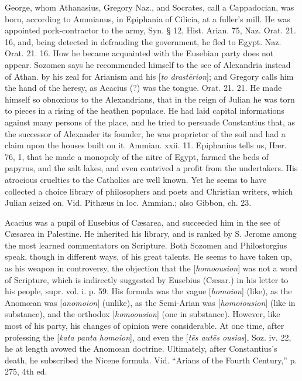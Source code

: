 George, whom Athanasius, Gregory Naz., and
Socrates, call a Cappadocian, was born, according to Ammianus, in
Epiphania of Cilicia, at a fuller's mill. He was appointed
pork-contractor to the army, Syn. § 12, Hist. Arian. 75, Naz. Orat.
21. 16, and, being detected in defrauding the government, he fled to
Egypt. Naz. Orat. 21. 16. How he became acquainted with the Eusebian
party does not appear. Sozomen says he recommended himself to the see
of Alexandria instead of Athan. by his zeal for Arianism and his [\emph{to
drast\={e}rion}]; and Gregory calls him the hand of the heresy,
as Acacius (?) was the tongue. Orat. 21. 21. He made himself so
obnoxious to the Alexandrians, that in the reign of Julian he was torn
to pieces in a rising of the heathen populace. He had laid capital
informations against many persons of the place, and he tried to
persuade Constantius that, as the successor of Alexander its founder,
he was proprietor of the soil and had a claim upon the houses
built on it. Ammian. xxii. 11. Epiphanius tells us, Hær. 76, 1, that
he made a monopoly of the nitre of Egypt, farmed the beds of papyrus,
and the salt lakes, and even contrived a profit from the undertakers.
His atrocious cruelties to the Catholics are well known. Yet he seems
to have collected a choice library of philosophers and poets and
Christian writers, which Julian seized on. Vid. Pithæus in loc.
Ammian.; also Gibbon, ch. 23.

Acacius was a pupil of Eusebius of Cæsarea, and
succeeded him in the see of Cæsarea in Palestine. He inherited his
library, and is ranked by S. Jerome among the most learned
commentators on Scripture. Both Sozomen and Philostorgius speak,
though in different ways, of his great talents. He seems to have taken
up, as his weapon in controversy, the objection that the [\emph{homoousion}]
was not a word of Scripture, which is indirectly suggested by Eusebius
(Cæsar.) in his letter to his people, supr. vol. i. p. 59. His
formula was the vague [\emph{homoion}] (like), as the Anomœan was [\emph{anomoion}]
(unlike), as the Semi-Arian was [\emph{homoiousion}] (like in
substance), and the orthodox [\emph{homoousion}] (one in substance).
However, like most of his party, his changes of opinion were
considerable. At one time, after professing the [\emph{kata panta homoion}],
and even the [\emph{t\={e}s aut\={e}s ousias}], Soz. iv. 22, he
at length avowed the Anomœan doctrine. Ultimately, after Constantius's
death, he subscribed the Nicene formula. Vid. ``Arians of the Fourth
Century,'' p. 275, 4th ed.

